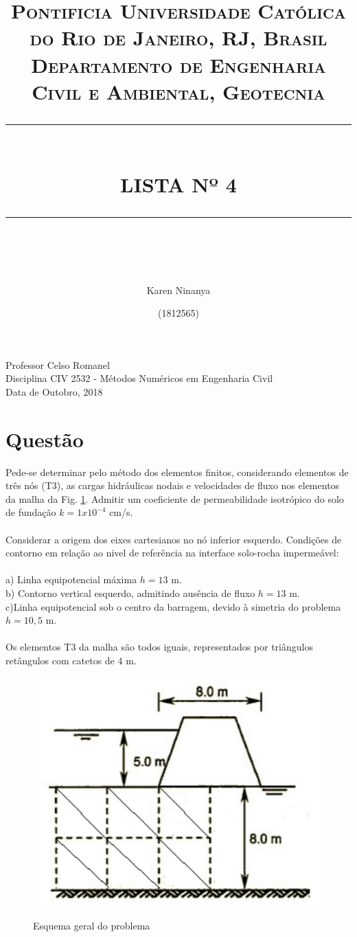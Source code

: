 \documentclass{article} %
\title{
	\normalfont \normalsize 
	\textsc{Pontificia Universidade Católica do Rio de Janeiro, RJ, Brasil \\ 
		Departamento de Engenharia Civil e Ambiental, Geotecnia} \\
	[10pt] 
	\rule{\linewidth}{0.5pt} \\[6pt] 
	\huge LISTA Nº 4\\
	\rule{\linewidth}{2pt}  \\[10pt]
}
\author{Karen Ninanya}
\date{\normalsize (1812565)}
\begin{document}
	
	\maketitle
	\noindent
	Professor \dotfill Celso Romanel\\
	Disciplina \dotfill CIV 2532 - Métodos Numéricos em Engenharia Civil\\
	Data  de Outobro, 2018 \\
	
	\newpage
	\newpage


\section*{Questão}

\vspace{10mm}
Pede-se determinar pelo método dos elementos finitos, considerando elementos de três nós (T3), as cargas hidráulicas nodais e velocidades de fluxo nos elementos da malha da Fig. \ref{questao}. Admitir um coeficiente de permeabilidade isotrópico do solo de fundação \(k=1x10^{-4}\) cm/s.\\
\\
Considerar a origem dos eixes cartesianos no nó inferior esquerdo. Condições de contorno em relação ao nivel de referência na interface solo-rocha impermeável:\\
\\
\indent a) Linha equipotencial máxima \(h=13\) m.\\
\indent b) Contorno vertical esquerdo, admitindo ausência de fluxo \(h=13\) m.\\
\indent c)Linha equipotencial sob o centro da barragem, devido à simetria do problema \(h=10,5\) m.\\
\\
Os elementos T3 da malha são todos iguais, representados por triângulos retângulos com catetos de \(4\) m.

\begin{figure}[H]
	\centering
	\caption{Esquema geral do problema}
	\includegraphics[width=0.45\linewidth]{principal}	
	\label{questao}	
\end{figure}
\end{document}
